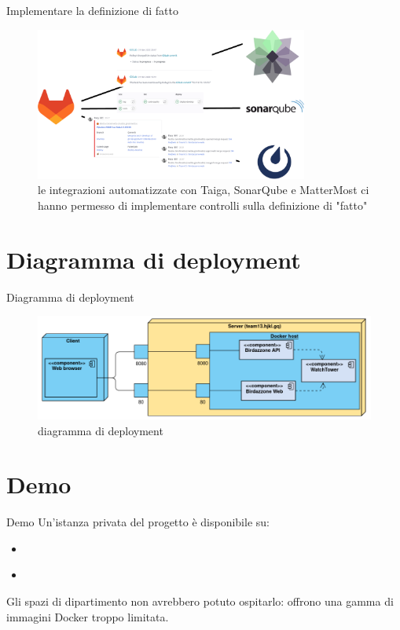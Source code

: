 \documentclass{beamer}
\begin{document}
\begin{frame}{Implementare la definizione di fatto}
	\begin{figure}
		\includegraphics[width=0.8\textwidth]{integrations}
		\caption{le integrazioni automatizzate con Taiga, SonarQube e MatterMost ci
			hanno permesso di implementare controlli sulla definizione di "fatto"}
	\end{figure}
\end{frame}

\section{Diagramma di deployment}
\begin{frame}{Diagramma di deployment}
	\begin{figure}
		\includegraphics[width=\textwidth]{deployment}
		\caption{diagramma di deployment}
	\end{figure}
\end{frame}

\section{Demo}
\begin{frame}{Demo}
	Un'istanza privata del progetto \`e disponibile su:
	\begin{itemize}
		\item \href{http://team13.hjkl.gq:8000/swagger/index.html}{}
		\item \href{http://team13.hjkl.gq}{}
	\end{itemize}
	Gli spazi di dipartimento non avrebbero potuto ospitarlo: offrono una gamma di
	immagini Docker troppo limitata.
\end{frame}
\end{document}
